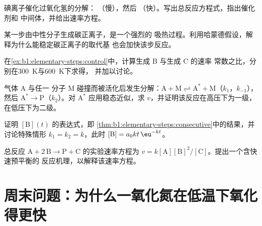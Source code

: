\begin{exercise}[$\star\star$]\label{exo:b1:elementary-steps:7}
碘离子催化过氧化氢的分解：
（慢），然后 
（快）。写出总反应方程式，指出催化剂和
中间体，并给出速率方程。
\end{exercise}

\begin{exercise}[$\star\star$]\label{exo:b1:elementary-steps:8}
某一步由中性分子生成碳正离子，是一个强烈的
吸热过程。利用哈蒙德假设，解释为什么能稳定碳正离子的取代基
也会加快该步反应。
\end{exercise}

\begin{exercise}[$\star\star$]\label{exo:b1:elementary-steps:9}
在\cref{ex:b1:elementary-steps:control}中，计算生成 B 与生成 C 的速率
常数之比，分别在\qty{300}{K}与\qty{600}{K}下求得，
并加以讨论。
\end{exercise}

\begin{exercise}[$\star\star\star$]\label{exo:b1:elementary-steps:10}
气体 $\mathrm{A}$ 与任一
分子 $\mathrm{M}$ 碰撞而被活化后发生分解：$\mathrm{A} + \mathrm{M} \rightleftharpoons
\mathrm{A}^* + \mathrm{M}$（$k_1$，$k_{-1}$），然后 $\mathrm{A}^* \to
\mathrm{P}$（$k_2$）。对
$\mathrm{A}^*$ 应用稳态近似，求 $v$，并证明该反应在高压下为一级，
在低压下为二级。
\end{exercise}

\begin{exercise}[$\star\star\star$]\label{exo:b1:elementary-steps:11}
证明 $[\mathrm{B}](t)$ 的表达式，即
\cref{thm:b1:elementary-steps:consecutive}中的结果，并讨论特殊情形
$k_1 = k_2 = k$，此时 $[\mathrm{B}] = a_0kt\,\eu^{-kt}$。
\end{exercise}

\begin{exercise}[$\star\star\star$]\label{exo:b1:elementary-steps:12}
总反应 $\mathrm{A} + 2\,\mathrm{B} \to \mathrm{P} +
\mathrm{C}$ 的实验速率方程为 $v =
k[\mathrm{A}][\mathrm{B}]^2/[\mathrm{C}]$。提出一个含快速预平衡的
反应机理，以解释该速率方程。
\end{exercise}

\section{周末问题：为什么一氧化氮在低温下氧化得更快}


